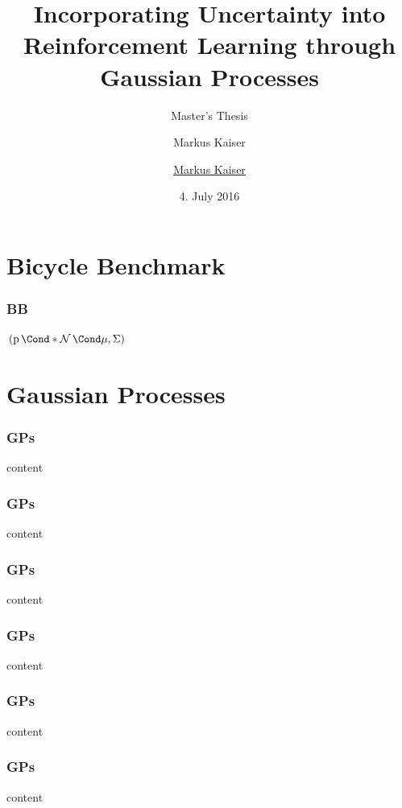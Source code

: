 



\title{Incorporating Uncertainty into Reinforcement Learning through Gaussian Processes}
\author{Markus Kaiser}
\subtitle{Master's Thesis}
\author{\href{mailto:markus.kaiser@in.tum.de}{Markus Kaiser}}
\date{4. July 2016}



\begin{frame}[plain]
    \titlepage
\end{frame}

\section{Bicycle Benchmark}
\begin{frame}
    \frametitle{BB}

    $\Bicycle{\Prob*{\Gaussian{\mu, \Sigma}}}$
\end{frame}

\section{Gaussian Processes}
\begin{frame}
    \frametitle{GPs}

    content
\end{frame}
\begin{frame}
    \frametitle{GPs}

    content
\end{frame}
\begin{frame}
    \frametitle{GPs}

    content
\end{frame}
\begin{frame}
    \frametitle{GPs}

    content
\end{frame}
\begin{frame}
    \frametitle{GPs}

    content
\end{frame}
\begin{frame}
    \frametitle{GPs}

    content
\end{frame}

